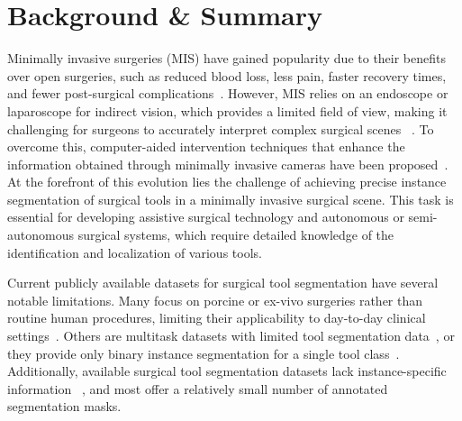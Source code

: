 \section*{Background \& Summary}
%
Minimally invasive surgeries (MIS) have gained popularity due to their benefits over open surgeries, such as reduced blood loss, less pain, faster recovery times, and fewer post-surgical complications~\cite{fuchs2002minimally}. However, MIS relies on an endoscope or laparoscope for indirect vision, which provides a limited field of view, making it challenging for surgeons to accurately interpret complex surgical scenes ~\cite{real_time_seg_adverserial_cis}. To overcome this, computer-aided intervention techniques that enhance the information obtained through minimally invasive cameras have been proposed~\cite{vecauteren_cai_4_cai_cis,cv_in_surgery_cis}.
At the forefront of this evolution lies the challenge of achieving precise instance segmentation of surgical tools in a minimally invasive surgical scene.
This task is essential for developing assistive surgical technology and autonomous or semi-autonomous surgical systems, which require detailed knowledge of the identification and localization of various tools.

Current publicly available datasets for surgical tool segmentation have several notable limitations.
Many focus on porcine or ex-vivo surgeries rather than routine human procedures, limiting their applicability to day-to-day clinical settings~\cite{endovis2015,endovis2017_cis,endovis2018_cis}.
Others are multitask datasets with limited tool segmentation data~\cite{autolaparo_cis}, or they provide only binary instance segmentation for a single tool class~\cite{robustmis2019_cis}. Additionally, available surgical tool segmentation datasets lack instance-specific information ~\cite{endovis2015,endovis2017_cis,endovis2018_cis,autolaparo_cis,psychogyios2023sar_cis,cholecseg8k_cis}, and most offer a relatively small number of annotated segmentation masks. 



